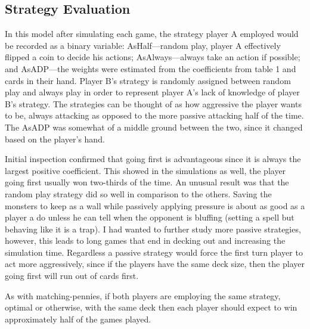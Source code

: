 \FloatBarrier
\subsection{Strategy Evaluation}
In this model after simulating each game, the strategy player A employed would be recorded as a binary variable: AsHalf---random play, player A effectively flipped a coin to decide his actions; AsAlways---always take an action if possible; and AsADP---the weights were estimated from the coefficients from table 1 and cards in their hand. Player B's strategy is randomly assigned between random play and always play in order to represent player A's lack of knowledge of player B's strategy. The strategies can be thought of as how aggressive the player wants to be, always attacking as opposed to the more passive attacking half of the time. The AsADP was somewhat of a middle ground between the two, since it changed based on the player's hand.

Initial inspection confirmed that going first is advantageous since it is always the largest positive coefficient. This showed in the simulations as well, the player going first usually won two-thirds of the time. An unusual result was that the random play strategy did so well in comparison to the others. Saving the monsters to keep as a wall while passively applying pressure is about as good as a player a do unless he can tell when the opponent is bluffing (setting a spell but behaving like it is a trap). I had wanted to further study more passive strategies, however, this leads to long games that end in decking out and increasing the simulation time. Regardless a passive strategy would force the first turn player to act more aggressively, since if the players have the same deck size, then the player going first will run out of cards first.

As with matching-pennies, if both players are employing the same strategy, optimal or otherwise, with the same deck then each player should expect to win approximately half of the games played. 


{\footnotesize

}





